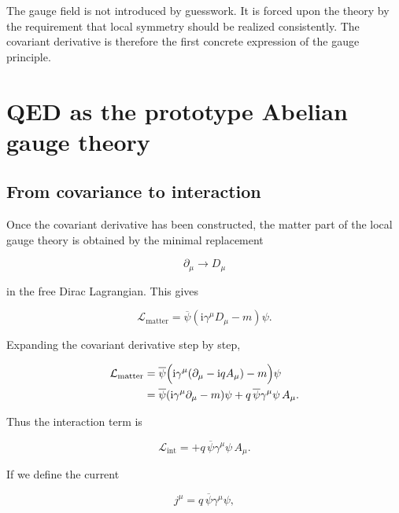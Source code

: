 \documentclass[11pt,a4paper]{article}
\newcommand{\Lag}{\mathcal{L}}
\newcommand{\ii}{\mathrm{i}}
\newcommand{\p}{\partial}
\newcommand{\gmu}{\gamma^\mu}
\newcommand{\psibar}{\overline{\psi}}
\begin{document}
\begin{takehomebox}
\vspace{0.25cm}
The gauge field is not introduced by guesswork. It is forced upon the theory by the requirement that local symmetry should be realized consistently. The covariant derivative is therefore the first concrete expression of the gauge principle.
\end{takehomebox}




\section{QED as the prototype Abelian gauge theory}

\subsection{From covariance to interaction}

Once the covariant derivative has been constructed, the matter part of the local gauge theory is obtained by the minimal replacement

\[
\p_\mu\longrightarrow D_\mu
\]

in the free Dirac Lagrangian. This gives

\begin{equation}
\Lag_{\text{matter}} = \psibar(\ii\gmu D_\mu-m)\psi.
\label{eq:qed-matter-compact-expanded}
\end{equation}

Expanding the covariant derivative step by step,

\begin{align}
\Lag_{\text{matter}}
&=
\psibar\Bigl(\ii\gmu(\p_\mu-\ii qA_\mu)-m\Bigr)\psi
\nonumber\\
&=
\psibar(\ii\gmu\p_\mu-m)\psi + q\,\psibar\gmu\psi\,A_\mu.
\label{eq:qed-matter-expanded-full}
\end{align}

Thus the interaction term is

\begin{equation}
\Lag_{\text{int}} = + q\,\psibar\gmu\psi\,A_\mu.
\label{eq:qed-interaction-term-expanded}
\end{equation}

If we define the current

\begin{equation}
j^\mu = q\,\psibar\gamma^\mu\psi,
\label{eq:qed-current-expanded}
\end{equation}
\end{document}
